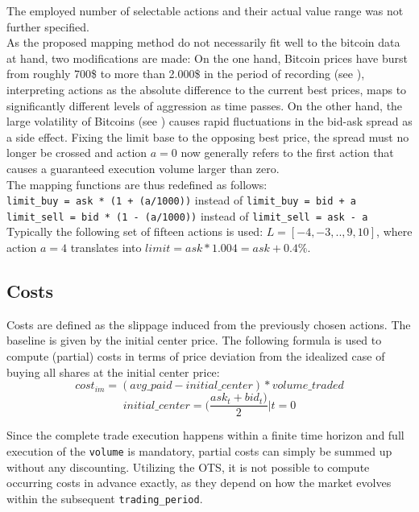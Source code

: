 The employed number of selectable actions and their actual value range was not further specified.\\

As the proposed mapping method do not necessarily fit well to the bitcoin data at hand, two modifications are made: On the one hand, Bitcoin prices have burst from roughly 700\$ to more than 2.000\$ in the period of recording (see ), \ie interpreting actions as the absolute difference to the current best prices, maps to significantly different levels of aggression as time passes. On the other hand, the large volatility of Bitcoins (see ) causes rapid fluctuations in the bid-ask spread as a side effect. Fixing the limit base to the opposing best price, the spread must no longer be crossed and action $a=0$ now generally refers to the first action that causes a guaranteed execution volume larger than zero.\\


The mapping functions are thus redefined as follows:\\
\lstinline!limit_buy = ask * (1 + (a/1000))! instead of \lstinline!limit_buy = bid + a!\\
\lstinline!limit_sell = bid * (1 - (a/1000))! instead of \lstinline!limit_sell = ask - a!\\

Typically the following set of fifteen actions is used: $L=[-4,-3,..,9,10]$, where \eg action $a=4$ translates into $limit = ask * 1.004 = ask + 0.4\%$. 


\subsection{Costs}
\label{chap:costs}
Costs are defined as the slippage induced from the previously chosen actions. The baseline is given by the initial center price. The following formula is used to compute (partial) costs in terms of price deviation from the idealized case of buying all shares at the initial center price:
\begin{equation}
\label{eq:imcost}
   cost_{im} = (avg\_paid - initial\_center) * volume\_traded
\end{equation}
\begin{equation}
   initial\_center = (\dfrac{ask_t+bid_t)}{2} | t=0
\end{equation}

Since the complete trade execution happens within a finite time horizon and full execution of the \lstinline!volume! is mandatory, partial costs can simply be summed up without any discounting. Utilizing the \ac{OTS}, it is not possible to compute occurring costs in advance exactly, as they depend on how the market evolves within the subsequent \lstinline!trading_period!.\\

